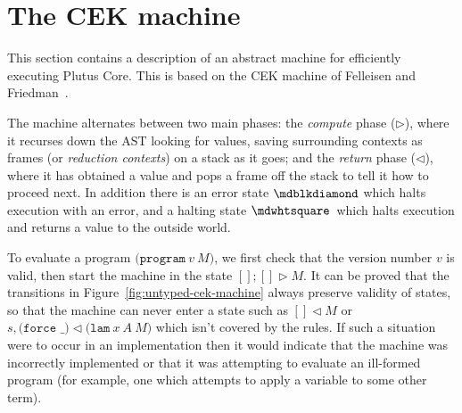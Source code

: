 \section{The CEK machine}
This section contains a description of an abstract machine for efficiently
executing Plutus Core.  This is based on the CEK machine of Felleisen and
Friedman~\citep{Felleisen-CK-CEK}.

\noindent The machine alternates between two main phases: the
\textit{compute} phase ($\triangleright$), where it recurses down
the AST looking for values, saving surrounding contexts as frames (or
\textit{reduction contexts}) on a stack as it goes; and the
\textit{return} phase ($\triangleleft$), where it has obtained a value and
pops a frame off the stack to tell it how to proceed next.  In
addition there is an error state $\cekerror$ which halts execution
with an error, and a halting state $\cekhalt{}$ which halts execution and
returns a value to the outside world.

To evaluate a program $\texttt{(program}\ v\ M \texttt{)}$, we first check that
the version number $v$ is valid, then start the machine in the state $[];[]
\triangleright M$.  It can be proved that the transitions in
Figure~\ref{fig:untyped-cek-machine} always preserve validity of states, so that
the machine can never enter a state such as $[] \triangleleft M$ or $s,
\texttt{(force \_)} \triangleleft \texttt{(lam}\ x\ A \ M\texttt{)}$ which isn't
covered by the rules.  If such a situation were to occur in an implementation
then it would indicate that the machine was incorrectly implemented or that it
was attempting to evaluate an ill-formed program (for example, one which attempts
to apply a variable to some other term).

